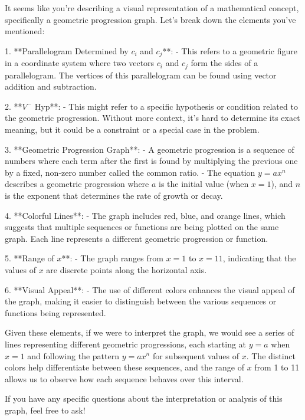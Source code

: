 It seems like you're describing a visual representation of a mathematical concept, specifically a geometric progression graph. Let's break down the elements you've mentioned:

1. **Parallelogram Determined by \(c_i\) and \(c_j\)**:
   - This refers to a geometric figure in a coordinate system where two vectors \(c_i\) and \(c_j\) form the sides of a parallelogram. The vertices of this parallelogram can be found using vector addition and subtraction.

2. **\(V^-\) Hyp**:
   - This might refer to a specific hypothesis or condition related to the geometric progression. Without more context, it's hard to determine its exact meaning, but it could be a constraint or a special case in the problem.

3. **Geometric Progression Graph**:
   - A geometric progression is a sequence of numbers where each term after the first is found by multiplying the previous one by a fixed, non-zero number called the common ratio.
   - The equation \(y = ax^n\) describes a geometric progression where \(a\) is the initial value (when \(x=1\)), and \(n\) is the exponent that determines the rate of growth or decay.

4. **Colorful Lines**:
   - The graph includes red, blue, and orange lines, which suggests that multiple sequences or functions are being plotted on the same graph. Each line represents a different geometric progression or function.

5. **Range of \(x\)**:
   - The graph ranges from \(x=1\) to \(x=11\), indicating that the values of \(x\) are discrete points along the horizontal axis.

6. **Visual Appeal**:
   - The use of different colors enhances the visual appeal of the graph, making it easier to distinguish between the various sequences or functions being represented.

Given these elements, if we were to interpret the graph, we would see a series of lines representing different geometric progressions, each starting at \(y=a\) when \(x=1\) and following the pattern \(y=ax^n\) for subsequent values of \(x\). The distinct colors help differentiate between these sequences, and the range of \(x\) from 1 to 11 allows us to observe how each sequence behaves over this interval.

If you have any specific questions about the interpretation or analysis of this graph, feel free to ask!